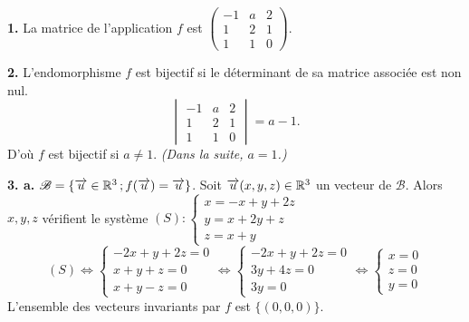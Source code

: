 \documentclass[11pt]{article}
\begin{document}


\textbf{1.} La matrice de l'application $f$ est $\begin{pmatrix} -1 & a & 2 \\ 1 & 2 & 1 \\ 1 & 1 & 0 \end{pmatrix}$.

\textbf{2.} L'endomorphisme $f$ est bijectif si le déterminant de sa matrice associée est non nul.
\[ \begin{vmatrix} -1 & a & 2 \\ 1 & 2 & 1 \\ 1 & 1 & 0 \end{vmatrix} = a - 1. \]
D'où $f$ est bijectif si $a \ne 1$. \emph{(Dans la suite, $a = 1$.)}

\textbf{3. a.} $\mathscr{B} = \{\overrightarrow{u} \in \mathbb{R}^3\,;f(\overrightarrow{u}) = \overrightarrow{u}\}$. Soit $\overrightarrow{u}(x, y, z) \in \mathbb{R}^3$ un vecteur de $\mathscr{B}$. Alors $x, y, z$ vérifient le système $(S) : \begin{cases} x = -x + y + 2z \\ y = x + 2y + z \\ z = x + y \end{cases}$
\[ (S) \Longleftrightarrow \begin{cases} -2x + y + 2z = 0 \\ x + y + z = 0 \\ x + y - z = 0 \end{cases} \Longleftrightarrow \begin{cases} -2x + y + 2z = 0 \\ 3y + 4z = 0 \\ 3y = 0 \end{cases} \Longleftrightarrow \begin{cases} x = 0 \\ z = 0 \\ y = 0 \end{cases} \]
L'ensemble des vecteurs invariants par $f$ est $\{(0, 0, 0)\}$.
\end{document}
